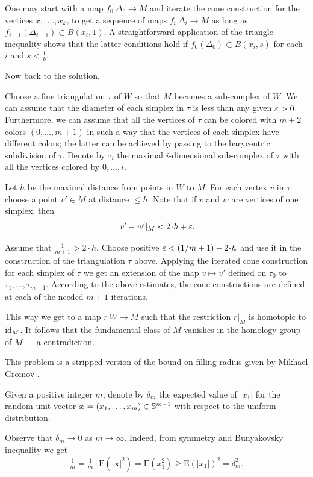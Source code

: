 One may start with a map $f_0\:\Delta_0\to M$ and iterate the cone construction for the vertices $x_1,\ldots, x_k$,
to get a sequence of maps $f_i\:\Delta_i\to M$
as long as $f_{i-1}(\Delta_{i-1})\subset B(x_i,1)$.
A straightforward application of the triangle inequality 
shows that the latter conditions hold if 
$f_0(\Delta_0)\subset B(x_i,s)$ for each $i$ and $s<\tfrac1k$.

\medskip

Now back to the solution.

Choose a fine triangulation $\tau$ of $W$ so that $M$ becomes a sub-complex of $W$.
We can assume that the diameter of each simplex in $\tau$ is less than any given
$\varepsilon>0$.
Furthermore, we can assume that all the vertices of $\tau$ can be colored with $m+2$ colors $(0,\ldots, m+1)$
in such a way that the vertices of each simplex 
have different colors;
the latter can be achieved by passing to the barycentric subdivision of $\tau$.
Denote by $\tau_i$ the maximal $i$-dimensional sub-complex of $\tau$ 
with all the vertices colored by $0,\ldots, i$.

Let $h$ be the maximal distance from points in $W$ to $M$.
For each vertex $v$ in $\tau$ 
choose a point $v'\in M$ at distance $\le h$.
Note that 
if $v$ and $w$ are vertices of one simplex,
then
\[|v'-w'|_M<2\cdot h+\eps.\]

Assume that $\tfrac1{m+1}>2\cdot h$.
Choose positive $\eps<\tfrac1{m+1}-2\cdot h$ and use it in the construction of the triangulation $\tau$ above.
Applying the iterated cone construction for each simplex of $\tau$
we get an extension of the map $v\mapsto v'$ defined on $\tau_0$ to $\tau_1,\ldots,\tau_{m+1}$.
According to the above estimates, the cone constructions are defined at each of the needed $m+1$ iterations.

This way we get 
to a map $r\:W\to M$ such that the restriction $r|_M$ is homotopic to $\operatorname{\rm id}_M$.
It follows that the fundamental class of $M$ vanishes in the homology group of $M$ ---
a contradiction. 
\qeds


This problem is a stripped version of the bound on filling radius given by Mikhael Gromov \cite{gromov-filling}.  

Given a positive integer $m$,
denote by $\delta_m$ 
the expected value of $|x_1|$ for the random unit vector 
$\bm{x}\z=(x_1,\ldots,x_m)\z\in\mathbb{S}^{m-1}$
with respect to the uniform distribution.

Observe that $\delta_m\to 0$ as $m\to\infty$.
Indeed, from symmetry and Bunyakovsky inequality we get
\[
\tfrac1m=\tfrac1m\cdot\mathrm{E}(|\bm{x}|^2)
=\mathrm{E}(x_1^2)\ge \mathrm{E}(|x_1|)^2=\delta_m^2.
\]

